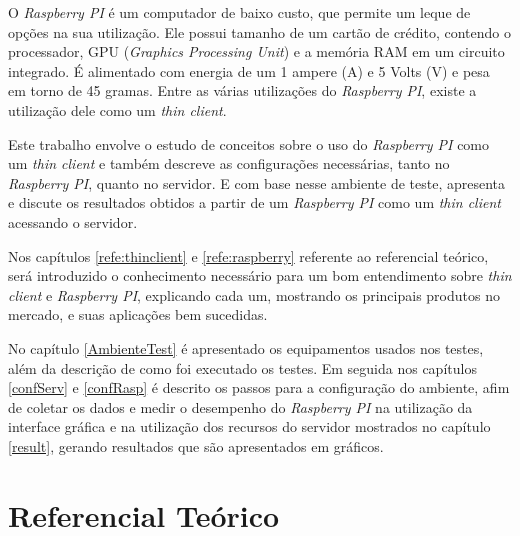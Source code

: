 \documentclass[
	12pt,				%
	openright,			%
	twoside,			%
	a4paper,			%
	chapter=TITLE,		%
	english,			%
	brazil				%
	]{abntex2}
\begin{document}
O \textit{Raspberry PI} é um computador de baixo custo, que permite um leque de opções na sua utilização. Ele possui tamanho de um cartão de crédito, contendo o processador, GPU (\textit{Graphics Processing Unit}) e a memória RAM em um circuito integrado. É alimentado com energia de um 1 ampere (A) e 5 Volts (V) e pesa em torno de 45 gramas. Entre as várias utilizações do \textit{Raspberry PI}, existe a utilização dele como um  \textit{thin client}.

Este trabalho envolve o estudo de conceitos sobre o uso do \textit{Raspberry PI} como um \textit{thin client} e também descreve as configurações necessárias, tanto no \textit{Raspberry PI}, quanto no servidor. E com base nesse ambiente de teste, apresenta e discute os resultados obtidos a partir de um \textit{Raspberry PI} como um \textit{thin client} acessando o servidor.

Nos capítulos \ref{refe:thinclient} e \ref{refe:raspberry} referente ao referencial teórico, será introduzido o conhecimento necessário para um bom entendimento sobre  \textit{thin client} e \textit{Raspberry PI}, explicando cada um, mostrando os principais produtos no mercado, e suas aplicações bem sucedidas. 

No capítulo \ref{AmbienteTest} é apresentado os equipamentos usados nos testes, além da descrição de como foi executado os testes. Em seguida nos capítulos \ref{confServ} e \ref{confRasp} é descrito os passos para a configuração do ambiente, afim de coletar os dados e medir o desempenho do \textit{Raspberry PI} na utilização da interface gráfica e na utilização dos recursos do servidor mostrados no capítulo \ref{result}, gerando resultados que são apresentados em gráficos.






\chapter{Referencial Teórico}
\end{document}
